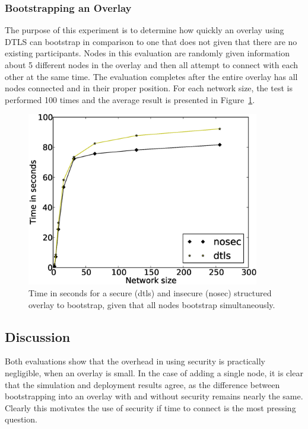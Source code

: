 \subsubsection{Bootstrapping an Overlay}

The purpose of this experiment is to determine how quickly an overlay using
DTLS can bootstrap in comparison to one that does not given that there are no
existing participants.  Nodes in this evaluation are randomly given information
about 5 different nodes in the overlay and then all attempt to connect with
each other at the same time.  The evaluation completes after the entire overlay
has all nodes connected and in their proper position.  For each network size,
the test is performed 100 times and the average result is presented in
Figure~\ref{fig:bootstrap_eval}.

\begin{figure}[ht]
\centering
\includegraphics[width=4in]{figs/bootstrap_time.eps}
\caption[Bootstrapping a secure overlay]{Time in seconds for a secure (dtls)
and insecure (nosec) structured overlay to bootstrap, given that all nodes
bootstrap simultaneously.}
\label{fig:bootstrap_eval}
\end{figure}

\subsection{Discussion}

Both evaluations show that the overhead in using security is practically
negligible, when an overlay is small.  In the case of adding a single node, it
is clear that the simulation and deployment results agree, as the difference
between bootstrapping into an overlay with and without security remains nearly
the same.  Clearly this motivates the use of security if time to connect is the
most pressing question.


